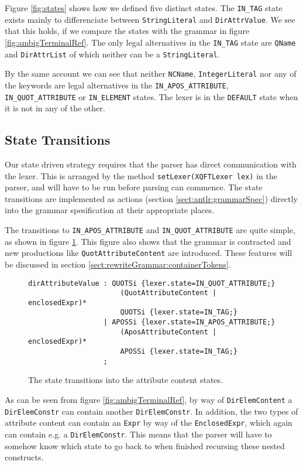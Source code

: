 Figure \ref{fig:states} shows how we defined five distinct states. The \verb!IN_TAG! state exists mainly to differenciate between \verb!StringLiteral! and \verb!DirAttrValue!. We see that this holds, if we compare the states with the grammar in figure \ref{fig:ambigTerminalRef}. The only legal alternatives in the \verb!IN_TAG! state are \verb!QName! and \verb!DirAttrList! of which neither can be a \verb!StringLiteral!. 

By the same account we can see that neither \verb!NCName!, \verb!IntegerLiteral! nor any of the keywords are legal alternatives in the \verb!IN_APOS_ATTRIBUTE!, \verb!IN_QUOT_ATTRIBUTE! or \verb!IN_ELEMENT! states. The lexer is in the \verb!DEFAULT! state when it is not in any of the other.

\subsection{State Transitions}
\label{sect:rewriteGrammar:transitions}
Our state driven strategy requires that the parser has direct communication with the lexer. This is arranged by the method \verb!setLexer(XQFTLexer lex)! in the parser, and will have to be run before parsing can commence. The state transitions are implemented as actions (section \ref{sect:antlr:grammarSpec}) directly into the grammar spesification at their appropriate places. 

The transitions to \verb!IN_APOS_ATTRIBUTE! and \verb!IN_QUOT_ATTRIBUTE! are quite simple, as shown in figure \ref{fig:transitionSimple}. This figure also shows that the grammar is contracted and new productions like \verb!QuotAttributeContent! are introduced. These features will be discussed in section \ref{sect:rewriteGrammar:containerTokens}.
\begin{figure}[h!]
\begin{Verbatim}
dirAttributeValue : QUOTSi {lexer.state=IN_QUOT_ATTRIBUTE;}
                      (QuotAttributeContent | enclosedExpr)* 
                      QUOTSi {lexer.state=IN_TAG;}
                  | APOSSi {lexer.state=IN_APOS_ATTRIBUTE;}
                      (AposAttributeContent | enclosedExpr)* 
                      APOSSi {lexer.state=IN_TAG;}
                  ; 
\end{Verbatim}
\caption[Attribute content state transitions.]{The state transitions into the attribute content states.}
\label{fig:transitionSimple}
\end{figure}

As can be seen from figure \ref{fig:ambigTerminalRef}, by way of \verb!DirElemContent! a \verb!DirElemConstr! can contain another \verb!DirElemConstr!. In addition, the two types of attribute content can contain an \verb!Expr! by way of the \verb!EnclosedExpr!, which again can contain e.g. a \verb!DirElemConstr!. This means that the parser will have to somehow know which state to go back to when finished recursing these nested constructs. 

